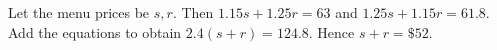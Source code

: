Let the menu prices be $s,r$. Then $1.15s+1.25r=63$ and $1.25s+1.15r=61.8$. Add the equations to obtain $2.4(s+r)=124.8$. Hence $\boxed{s+r=\$52}$.
